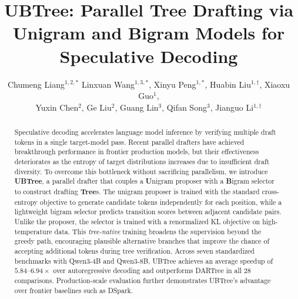 \documentclass[]{antgroup}
\title{UBTree: Parallel Tree Drafting via Unigram and Bigram Models for Speculative Decoding}
\author{\centering Chumeng Liang$^{1,2,*}$ Linxuan Wang$^{1,3,*}$, Xinyu Peng$^{1,*}$, Huabin Liu$^{1,\dagger}$, Xiaoxu Guo$^{1}$,\\ Yuxin Chen$^{2}$, Ge Liu$^{2}$, Guang Lin$^{3}$, Qifan Song$^{3}$, Jianguo Li$^{1,\dagger}$}
\affiliation{\centering $^1$Inclusion AI \quad\centering $^2$University of Illinois Urbana-Champaign  \quad\centering $^3$Purdue University\\[1.5mm]
\href{https://www.inclusion-ai.org/ubtree/}{\textcolor[cmyk]{0,1,0,0}{\texttt{https://www.inclusion-ai.org/ubtree/}}}}
\begin{document}
\maketitle
\begingroup
\renewcommand{\thefootnote}{}
\endgroup

\begin{abstract}
Speculative decoding accelerates language model inference by verifying multiple draft tokens in a single target-model pass. Recent parallel drafters have achieved breakthrough performance in frontier production models, but their effectiveness deteriorates as the entropy of target distributions increases due to insufficient draft diversity. To overcome this bottleneck without sacrificing parallelism, we introduce \textbf{UBTree}, a parallel drafter that couples a \textbf{U}nigram proposer with a \textbf{B}igram selector to construct drafting \textbf{Tree}s. The unigram proposer is trained with the standard cross-entropy objective to generate candidate tokens independently for each position, while a lightweight bigram selector predicts transition scores between adjacent candidate pairs. Unlike the proposer, the selector is trained with a renormalized KL objective on high-temperature data. This \textit{tree-native} training broadens the supervision beyond the greedy path, encouraging plausible alternative branches that improve the chance of accepting additional tokens during tree verification. Across seven standardized benchmarks with Qwen3-4B and Qwen3-8B, UBTree achieves an average speedup of $5.84$--$6.94\times$ over autoregressive decoding and outperforms DARTree in all 28 comparisons. Production-scale evaluation further demonstrates UBTree's advantage over frontier baselines such as DSpark.
\end{abstract}











\clearpage
\appendix




\end{document}
